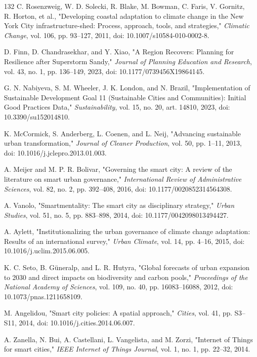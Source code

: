 \documentclass[pdflatex,sn-mathphys-num]{sn-jnl}%
\theoremstyle{thmstyleone}%
\theoremstyle{thmstyletwo}%
\theoremstyle{thmstylethree}%
\begin{document}
\begin{thebibliography}{132}
 C. Rosenzweig, W. D. Solecki, R. Blake, M. Bowman, C. Faris, V. Gornitz, R. Horton, et al., "Developing coastal adaptation to climate change in the New York City infrastructure-shed: Process, approach, tools, and strategies," \emph{Climatic Change}, vol. 106, pp. 93--127, 2011, doi: 10.1007/s10584-010-0002-8.

 D. Finn, D. Chandrasekhar, and Y. Xiao, "A Region Recovers: Planning for Resilience after Superstorm Sandy," \emph{Journal of Planning Education and Research}, vol. 43, no. 1, pp. 136--149, 2023, doi: 10.1177/0739456X19864145.

 G. N. Nabiyeva, S. M. Wheeler, J. K. London, and N. Brazil, "Implementation of Sustainable Development Goal 11 (Sustainable Cities and Communities): Initial Good Practices Data," \emph{Sustainability}, vol. 15, no. 20, art. 14810, 2023, doi: 10.3390/su152014810.

 K. McCormick, S. Anderberg, L. Coenen, and L. Neij, "Advancing sustainable urban transformation," \emph{Journal of Cleaner Production}, vol. 50, pp. 1--11, 2013, doi: 10.1016/j.jclepro.2013.01.003.

 A. Meijer and M. P. R. Bolivar, "Governing the smart city: A review of the literature on smart urban governance," \emph{International Review of Administrative Sciences}, vol. 82, no. 2, pp. 392--408, 2016, doi: 10.1177/0020852314564308.

 A. Vanolo, "Smartmentality: The smart city as disciplinary strategy," \emph{Urban Studies}, vol. 51, no. 5, pp. 883--898, 2014, doi: 10.1177/0042098013494427.

 A. Aylett, "Institutionalizing the urban governance of climate change adaptation: Results of an international survey," \emph{Urban Climate}, vol. 14, pp. 4--16, 2015, doi: 10.1016/j.uclim.2015.06.005.

 K. C. Seto, B. G\"uneralp, and L. R. Hutyra, "Global forecasts of urban expansion to 2030 and direct impacts on biodiversity and carbon pools," \emph{Proceedings of the National Academy of Sciences}, vol. 109, no. 40, pp. 16083--16088, 2012, doi: 10.1073/pnas.1211658109.

 M. Angelidou, "Smart city policies: A spatial approach," \emph{Cities}, vol. 41, pp. S3--S11, 2014, doi: 10.1016/j.cities.2014.06.007.

 A. Zanella, N. Bui, A. Castellani, L. Vangelista, and M. Zorzi, "Internet of Things for smart cities," \emph{IEEE Internet of Things Journal}, vol. 1, no. 1, pp. 22--32, 2014.


\end{thebibliography}
\end{document}
